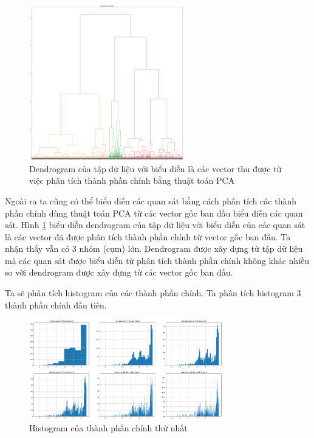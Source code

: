 \begin{figure}[H]
    \centering
    \includegraphics[width=0.6\textwidth]{figures/Thanh/Data_Analysis/Non_null_dendrogram_PCA_features.png}
    \caption{Dendrogram của tập dữ liệu với biểu diễn là các vector thu được từ việc phân tích thành phần chính bằng thuật toán PCA}
    \label{fig:Non_null_dendrogram_PCA_features}
\end{figure}

Ngoài ra ta cũng có thể biểu diễn các quan sát bằng cách phân tích các thành phần chính dùng thuật toán PCA từ các vector gốc ban đầu biểu diễn các quan sát.
Hình \ref{fig:Non_null_dendrogram_PCA_features} biểu diễn dendrogram của tập dữ liệu với biểu diễn của các quan sát là các vector đã được phân tích thành phần chính từ vector gốc ban đầu.
Ta nhận thấy vẫn có 3 nhóm (cụm) lớn. Dendrogram được xây dựng từ tập dữ liệu mà các quan sát được biểu diễn từ phân tích thành phần chính không khác nhiều so với dendrogram được xây dựng từ các vector gốc ban đầu.

Ta sẽ phân tích histogram của các thành phần chính.
Ta phân tích histogram 3 thành phần chính đầu tiên.

\begin{figure}[H]
    \centering
    \includegraphics[width=0.75\textwidth]{figures/Thanh/Data_Analysis/Non_null_histogram_PCA_feature_0.png}
    \caption{Histogram của thành phần chính thứ nhất}
    \label{fig:Non_null_histogram_PCA_feature_0}
\end{figure}

